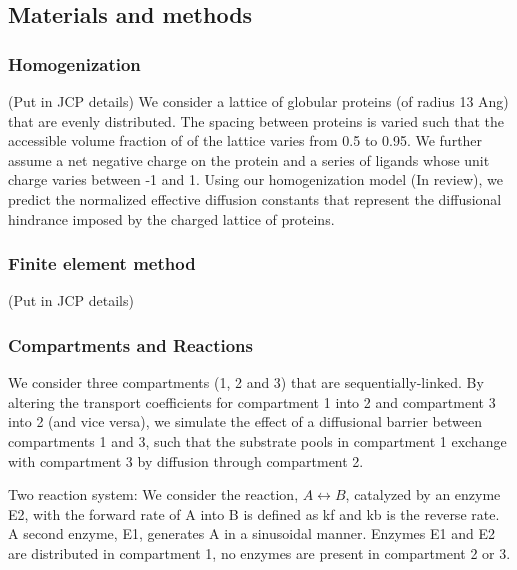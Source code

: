 \subsection{Materials and methods}
\subsubsection{Homogenization}
(Put in JCP details)
We consider a lattice of globular proteins (of radius 13 Ang) that are evenly distributed. The spacing between proteins is varied such that the accessible volume fraction of of the lattice varies from 0.5 to 0.95. We further assume a net negative charge on the protein and a series of ligands whose unit charge varies between -1 and 1. Using our homogenization model \cite{KekenesHuskey:lolPRe3}(In review), we predict the normalized effective diffusion constants that represent the diffusional hindrance imposed by the charged lattice of proteins. 

\subsubsection{Finite element method} 
(Put in JCP details) 

\subsubsection{Compartments and Reactions} 
\lbi
\item We consider three compartments (1, 2 and 3) that are sequentially-linked. By altering the transport coefficients for compartment 1 into 2 and compartment 3 into 2 (and vice versa), we simulate the effect of a diffusional barrier between compartments 1 and 3, such that the substrate pools in compartment 1 exchange with compartment 3 by diffusion through compartment 2. 



\item Two reaction system: We consider the reaction, $A \leftrightarrow  B$, catalyzed by an enzyme E2, with the forward rate of
A into B is defined as kf and kb is the reverse rate. A second enzyme, E1, generates A in a sinusoidal
manner. Enzymes E1 and E2 are distributed in compartment 1, no enzymes are present in compartment 2 or 3.


